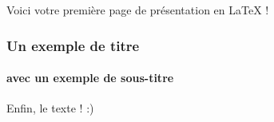 \documentclass{beamer}
\begin{document}
	\begin{frame}
	Voici votre première page de présentation en LaTeX !
	\end{frame}

    \begin{frame}
        \frametitle{Un exemple de titre}
        \framesubtitle{avec un exemple de sous-titre}
        Enfin, le texte ! :)
    \end{frame}
\end{document}
